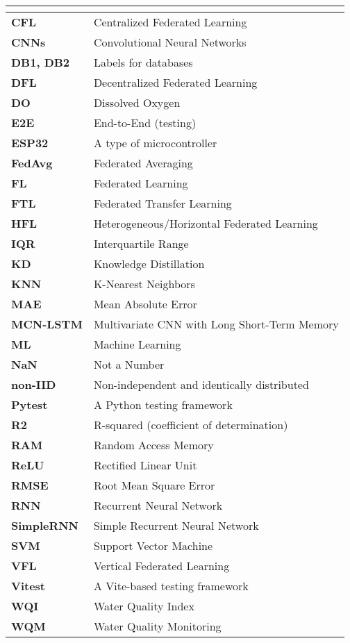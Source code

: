 {\vspace*{-1em}  %

\begin{longtable}{|>{\bfseries}p{2.5cm}|>{\raggedright\arraybackslash}p{8.5cm}|}
\hline
\multicolumn{2}{|c|}{\textbf{ML / Technical Terms (A-Z)}} \\
\hline
CFL & Centralized Federated Learning \\
CNNs & Convolutional Neural Networks \\
DB1, DB2 & Labels for databases \\
DFL & Decentralized Federated Learning \\
DO & Dissolved Oxygen \\
E2E & End-to-End (testing) \\
ESP32 & A type of microcontroller \\
FedAvg & Federated Averaging \\
FL & Federated Learning \\
FTL & Federated Transfer Learning \\
HFL & Heterogeneous/Horizontal Federated Learning \\
IQR & Interquartile Range \\
KD & Knowledge Distillation \\
KNN & K-Nearest Neighbors \\
MAE & Mean Absolute Error \\
MCN-LSTM & Multivariate CNN with Long Short-Term Memory \\
ML & Machine Learning \\
NaN & Not a Number \\
non-IID & Non-independent and identically distributed \\
Pytest & A Python testing framework \\
R2 & R-squared (coefficient of determination) \\
RAM & Random Access Memory \\
ReLU & Rectified Linear Unit \\
RMSE & Root Mean Square Error \\
RNN & Recurrent Neural Network \\
SimpleRNN & Simple Recurrent Neural Network \\
SVM & Support Vector Machine \\
VFL & Vertical Federated Learning \\
Vitest & A Vite-based testing framework \\
WQI & Water Quality Index \\
WQM & Water Quality Monitoring \\
\hline
\end{longtable}

} %

\vspace*{-1em}
\pagebreak
